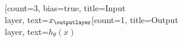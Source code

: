 \documentclass{article}
\begin{document}
  \begin{neuralnetwork}[height=4]
    \newcommand{\x}[2]{$x_#2$}
    \newcommand{\y}[2]{$h_{\theta}(x)$}
    [count=3, bias=true, title=Input\\layer, text=\x]
    \outputlayer[count=1, title=Output\\layer, text=\y] \linklayers
  \end{neuralnetwork}
\end{document}
